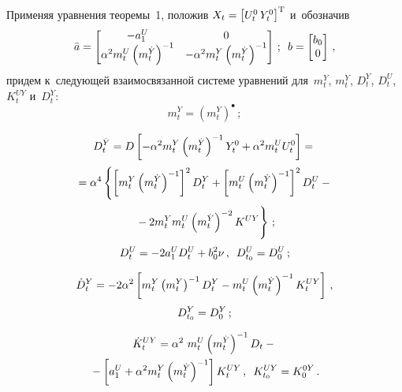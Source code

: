 \begin{multicols}{2}
{Применяя уравнения теоремы~1, положив $X_t\hm = \lk U_t^0\, Y_t^0\rk^{\mathrm{T}}$ 
и~обозначив
    $$
    \bar a=\begin{bmatrix}
    -a_1^U&0\\
    \alpha^2 m_t^U \left(m_t^{\dot Y}\right)^{-1}&- \alpha^2 m_t^Y 
    \left(m_t^{\dot Y}\right)^{-1}\end{bmatrix}\,;\enskip
    b=\begin{bmatrix}
    b_0\\ 0\end{bmatrix}\,, 
    $$
придем к~следующей взаимосвязанной системе уравнений для~$m_t^Y$, $m_t^{\dot Y}$, 
$D_t^Y$, $D_t^U$, $K_t^{UY}$ и~$D_t^{\dot Y}$:
    \begin{equation*}
    m_t^{\dot Y}= \left(m_t^{Y}\right)^\bullet\,;
    \end{equation*}
    
    \vspace*{-12pt}
    
    \noindent
    \begin{multline}
D_t^{\dot Y}= D\lk -\alp^2 m_t^Y \left(m_t^{\dot Y}\right)^{-1} Y_t^0 + 
\alp^2 m_t^U U_t^0\rk ={}\\[2pt]
{}= \alp^4 \left\{ \lk m_t^Y \left(m_t^{\dot Y}\right)^{-1}\rk^2 
D_t^Y+ \lk m_t^U \left(m_t^{\dot Y}\right)^{-1}\rk^2 D_t^U - {}\right.\\[2pt]
\left.{}-2 m_t^Y m_t^U \left(m_t^{\dot Y}\right)^{-2} K^{UY}
\vphantom{\lk m_t^Y \left(m_t^{\dot Y}\right)^{-1}\rk^2 }
\right\}\,;
\label{p21}
\end{multline}
    \begin{equation}
D_t^{U}=-2a_1^U D_t^U + b_0^2 \nu\,,\enskip 
D_{t_0}^U = D_0^U\,;
\label{p22}
\end{equation}

\vspace*{-10pt}

\noindent
    \begin{multline}
\dot D_t^{Y}=  -2\alpha^2\left[ m_t^Y \left(m_t^{Y}\right)^{-1} 
 D_t^Y -  m_t^U \left(m_t^{\dot Y}\right)^{-1}K_t^{UY}\right]\,,\\[3pt]  
 D_{t_0}^Y=D_0^Y\,;
 \label{p23}
 \end{multline}
 
   \vspace*{-12pt}

\noindent
    \begin{multline}
    \dot K_t^{UY}=  \alpha^2\ m_t^U \left(m_t^{\dot Y}\right)^{-1} D_t - {}\\
    {}-
    \left[ a_1^U + \alpha^2 m_t^Y \left(m_t^{\dot Y}\right)^{-1}\right] K_t^{UY}\,,\enskip  
    K_{t_0}^{UY}=K_0^{0Y}\,.
    \label{p24}
    \end{multline}

}
\end{multicols}

